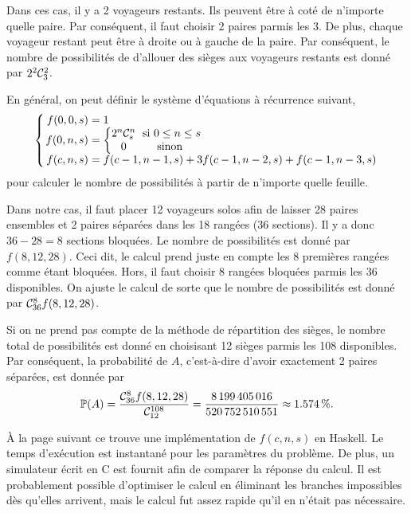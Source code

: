\documentclass[11pt]{article}
\newcommand\comb{%
    \ensuremath{%
        \mathcal{C}%
    }%
}
\renewcommand\P{%
    \ensuremath{%
        \mathbb{P}%
    }%
}
\begin{document}
Dans ces cas, il y a 2 voyageurs restants. Ils peuvent être à coté de n'importe
quelle paire. Par conséquent, il faut choisir 2 paires parmis les 3. De plus, chaque
voyageur restant peut être à droite ou à gauche de la paire. Par conséquent, le
nombre de possibilités de d'allouer des sièges aux voyageurs restants est donné
par $2^2\comb_3^2$.

En général, on peut définir le système d'équations à récurrence suivant,
\begin{equation*}
    \left\{
        \arraycolsep=1.4pt\def\arraystretch{1}
        \begin{array}{rcl}
            f(0,0,s)&=&1\\
            f(0,n,s)&=&\left\{
                \begin{matrix}
                    2^n\comb_s^n &\text{ si } 0\leq n\leq s\\
                    0            &\text{sinon}\\
                \end{matrix}
            \right.\\
            f(c,n,s)&=&f(c-1,n-1,s)+3f(c-1,n-2,s)+f(c-1,n-3,s)
        \end{array}
    \right.
\end{equation*}
pour calculer le nombre de possibilités à partir de n'importe quelle feuille.

Dans notre cas, il faut placer 12 voyageurs solos afin de laisser 28 paires
ensembles et 2 paires séparées dans les 18 rangées (36 sections). Il y a donc
$36-28=8$ sections bloquées. Le nombre de possibilités est donné par $f(8,12,28)$.
Ceci dit, le calcul prend juste en compte les 8 premières rangées comme étant
bloquées. Hors, il faut choisir 8 rangées bloquées parmis les 36 disponibles.
On ajuste le calcul de sorte que le nombre de possibilités est donné par
$\comb_{36}^8f(8,12,28)$.

Si on ne prend pas compte de la méthode de répartition des sièges, le nombre total
de possibilités est donné en choisisant 12 sièges parmis les 108 disponibles. Par
conséquent, la probabilité de $A$, c'est-à-dire d'avoir exactement 2 paires
séparées, est donnée par
\begin{equation*}
    \P(A)
    =\frac{\comb_{36}^8f(8,12,28)}{\comb_{12}^{108}}
    =\frac{\SI{8199405016}{}}{\SI{520752510551}{}}
    \approx\SI{1.574}{\percent}.
\end{equation*}

À la page suivant ce trouve une implémentation de $f(c,n,s)$ en Haskell. Le temps
d'exécution est instantané pour les paramètres du problème. De plus, un simulateur
écrit en C est fournit afin de comparer la réponse du calcul. Il est probablement
possible d'optimiser le calcul en éliminant les branches impossibles dès qu'elles
arrivent, mais le calcul fut assez rapide qu'il en n'était pas nécessaire.
\end{document}
